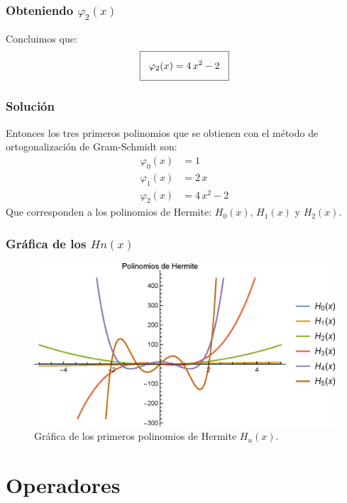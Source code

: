 \begin{frame}
\frametitle{Obteniendo $\varphi_{2}(x)$}
Concluimos que:
\begin{align*}
\setlength{\fboxsep}{3\fboxsep}\boxed{
\varphi_{2} (x) = 4 \, x^{2} - 2 }
\end{align*}
\end{frame}
\begin{frame}
\frametitle{Solución}
Entonces los tres primeros polinomios que se obtienen con el método de ortogonalización de Gram-Schmidt son:
\begin{align*}
\varphi_{0} (x) &= 1 \\[0.5em]
\varphi_{1} (x) &= 2 \, x \\[0.5em]
\varphi_{2} (x) &= 4 \, x^{2} - 2
\end{align*}
Que corresponden a los polinomios de Hermite: $H_{0}(x)$, $H_{1}(x)$ y $H_{2}(x)$.
\end{frame}
\begin{frame}
\frametitle{Gráfica de los $H{n}(x)$}
\begin{figure}[H]
   \centering
   \includegraphics[scale=0.7]{Imagenes/Plot_Hermite.eps}
   \caption{Gráfica de los primeros polinomios de Hermite $H_{n}(x)$.}
\end{figure}
\end{frame}
\section{Operadores}
